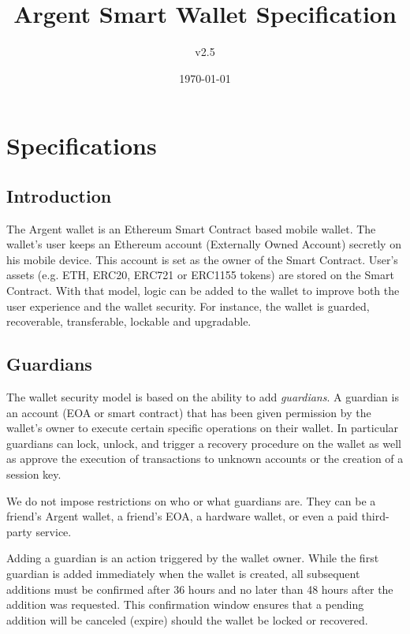 \documentclass[12pt]{article}
\title{Argent Smart Wallet Specification}
\author{v2.5}
\date{\today}
\begin{document}
\maketitle

\section{Specifications}

\subsection{Introduction}

The Argent wallet is an Ethereum Smart Contract based mobile wallet. The wallet's user keeps an Ethereum account (Externally Owned Account) secretly on his mobile device. This account is set as the owner of the Smart Contract. User's assets (e.g. ETH, ERC20, ERC721 or ERC1155 tokens) are stored on the Smart Contract. With that model, logic can be added to the wallet to improve both the user experience and the wallet security. For instance, the wallet is guarded, recoverable, transferable, lockable and upgradable.

\subsection{Guardians}

The wallet security model is based on the ability to add \textit{guardians}. A guardian is an account (EOA or smart contract) that has been given permission by the wallet's owner to execute certain specific operations on their wallet. In particular guardians can lock, unlock, and trigger a recovery procedure on the wallet as well as approve the execution of transactions to unknown accounts or the creation of a session key.

We do not impose restrictions on who or what guardians are. They can be a friend's Argent wallet, a friend's EOA, a hardware wallet, or even a paid third-party service.

Adding a guardian is an action triggered by the wallet owner. While the first guardian is added immediately when the wallet is created, all subsequent additions must be confirmed after 36 hours and no later than 48 hours after the addition was requested. This confirmation window ensures that a pending addition will be canceled (expire) should the wallet be locked or recovered.
\end{document}
